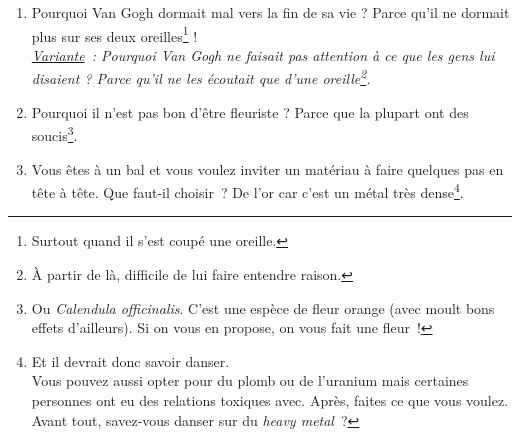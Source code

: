 \documentclass[10pt,a5paper,fullpage]{book}
\begin{document}
\begin{enumerate}
		\item Pourquoi Van Gogh dormait mal vers la fin de sa vie ? Parce qu'il ne dormait plus sur ses deux oreilles\footnote{Surtout quand il s'est coupé une oreille.} !
		\\\textit{\underline{Variante}~: Pourquoi Van Gogh ne faisait pas attention à ce que les gens lui disaient ? Parce qu'il ne les écoutait que d'une oreille\footnote{À partir de là, difficile de lui faire entendre raison.}.}
		\item Pourquoi il n'est pas bon d'être fleuriste ? Parce que la plupart ont des soucis\footnote{Ou \textit{Calendula officinalis}. C'est une espèce de fleur orange (avec moult bons effets d'ailleurs). Si on vous en propose, on vous fait une fleur~!}. 
		\item Vous êtes à un bal et vous voulez inviter un matériau à faire quelques pas en tête à tête. Que faut-il choisir~? De l'or car c'est un métal très dense\footnote{Et il devrait donc savoir danser. \\Vous pouvez aussi opter pour du plomb ou de l'uranium mais certaines personnes ont eu des relations toxiques avec. Après, faites ce que vous voulez. \\Avant tout, savez-vous danser sur du \textit{heavy metal}~?}.  
	\end{enumerate}
	
\end{document}
